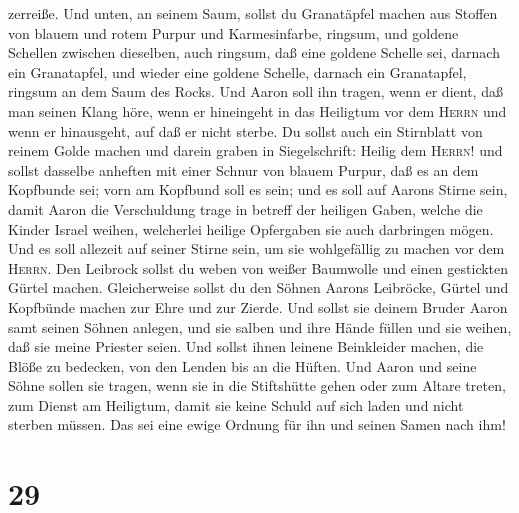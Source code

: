 zerreiße.  Und unten, an seinem Saum, sollst du
Granatäpfel machen aus Stoffen von blauem und rotem Purpur und
Karmesinfarbe, ringsum, und goldene Schellen zwischen dieselben, auch
ringsum,  daß eine goldene Schelle sei, darnach ein
Granatapfel, und wieder eine goldene Schelle, darnach ein Granatapfel,
ringsum an dem Saum des Rocks.  Und Aaron soll ihn
tragen, wenn er dient, daß man seinen Klang höre, wenn er hineingeht in
das Heiligtum vor dem \textsc{Herrn} und wenn er hinausgeht, auf daß er
nicht sterbe.  Du sollst auch ein Stirnblatt von reinem
Golde machen und darein graben in Siegelschrift: Heilig dem
\textsc{Herrn}!  und sollst dasselbe anheften mit einer
Schnur von blauem Purpur, daß es an dem Kopfbunde sei; vorn am Kopfbund
soll es sein;  und es soll auf Aarons Stirne sein, damit
Aaron die Verschuldung trage in betreff der heiligen Gaben, welche die
Kinder Israel weihen, welcherlei heilige Opfergaben sie auch darbringen
mögen. Und es soll allezeit auf seiner Stirne sein, um sie wohlgefällig
zu machen vor dem \textsc{Herrn}.  Den Leibrock sollst du
weben von weißer Baumwolle und einen gestickten Gürtel machen.
 Gleicherweise sollst du den Söhnen Aarons Leibröcke,
Gürtel und Kopfbünde machen zur Ehre und zur Zierde.  Und
sollst sie deinem Bruder Aaron samt seinen Söhnen anlegen, und sie
salben und ihre Hände füllen und sie weihen, daß sie meine Priester
seien.  Und sollst ihnen leinene Beinkleider machen, die
Blöße zu bedecken, von den Lenden bis an die Hüften.  Und
Aaron und seine Söhne sollen sie tragen, wenn sie in die Stiftshütte
gehen oder zum Altare treten, zum Dienst am Heiligtum, damit sie keine
Schuld auf sich laden und nicht sterben müssen. Das sei eine ewige
Ordnung für ihn und seinen Samen nach ihm!

\hypertarget{section-28}{%
\section{29}\label{section-28}}

